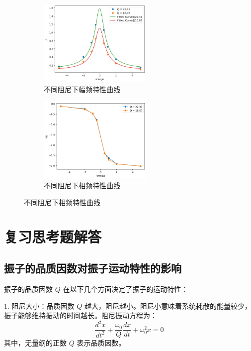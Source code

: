 \documentclass[UTF8]{ctexart}
\begin{document}
\begin{figure}[htbp]
    \centering
    \begin{subfigure}
        \centering
        \includegraphics[width=0.6\textwidth]{amplitude.png}
        \caption{不同阻尼下幅频特性曲线}
    \end{subfigure}
    \centering
    \begin{subfigure}
        \centering
        \includegraphics[width=0.6\textwidth]{phase.png}
        \caption{不同阻尼下相频特性曲线}    
    \end{subfigure}
\end{figure}
\newpage
\section{复习思考题解答}

\subsection{振子的品质因数对振子运动特性的影响}
振子的品质因数 \( Q \) 在以下几个方面决定了振子的运动特性：

1. 阻尼大小：品质因数 \( Q \) 越大，阻尼越小。阻尼小意味着系统耗散的能量较少，振子能够维持振动的时间越长。阻尼振动方程为：
   \[
   \frac{d^2 x}{dt^2} + \frac{\omega_0}{Q} \frac{dx}{dt} + \omega_0^2 x = 0
   \]
   其中，无量纲的正数 \( Q \) 表示品质因数。
\end{document}
